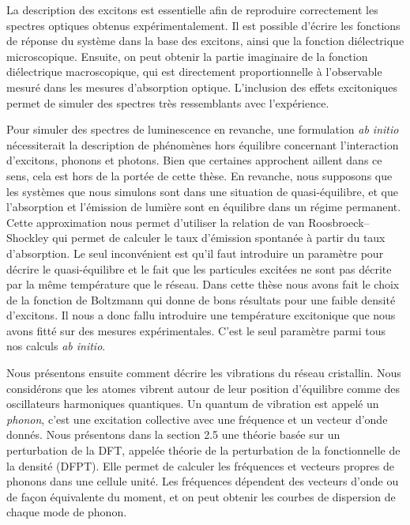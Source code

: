 La description des excitons est essentielle afin de reproduire correctement les spectres optiques obtenus expérimentalement. Il est possible d'écrire les fonctions de réponse du système dans la base des excitons, ainsi que la fonction diélectrique microscopique. Ensuite, on peut obtenir la partie imaginaire de la fonction diélectrique macroscopique, qui est directement proportionnelle à l'observable mesuré dans les mesures d'absorption optique. L'inclusion des effets excitoniques permet de simuler des spectres très ressemblants avec l'expérience.

Pour simuler des spectres de luminescence en revanche, une formulation \textit{ab initio} nécessiterait la description de phénomènes hors équilibre concernant l'interaction d'excitons, phonons et photons. Bien que certaines approchent aillent dans ce sens, cela est hors de la portée de cette thèse. En revanche, nous supposons que les systèmes que nous simulons sont dans une situation de quasi-équilibre, et que l'absorption et l'émission de lumière sont en équilibre dans un régime permanent. Cette approximation nous permet d'utiliser la relation de van Roosbroeck--Shockley qui permet de calculer le taux d'émission spontanée à partir du taux d'absorption. Le seul inconvénient est qu'il faut introduire un paramètre pour décrire le quasi-équilibre et le fait que les particules excitées ne sont pas décrite par la même température que le réseau. Dans cette thèse nous avons fait le choix de la fonction de Boltzmann qui donne de bons résultats pour une faible densité d'excitons. Il nous a donc fallu introduire une température excitonique que nous avons fitté sur des mesures expérimentales. C'est le seul paramètre parmi tous nos calculs \textit{ab initio}.

Nous présentons ensuite comment décrire les vibrations du réseau cristallin. Nous considérons que les atomes vibrent autour de leur position d'équilibre comme des oscillateurs harmoniques quantiques. Un quantum de vibration est appelé un \textit{phonon}, c'est une excitation collective avec une fréquence et un vecteur d'onde donnés. Nous présentons dans la section 2.5 une théorie basée sur un perturbation de la \acrshort{DFT}, appelée théorie de la perturbation de la fonctionnelle de la densité (DFPT). Elle permet de calculer les fréquences et vecteurs propres de phonons dans une cellule unité. Les fréquences dépendent des vecteurs d'onde ou de façon équivalente du moment, et on peut obtenir les courbes de dispersion de chaque mode de phonon. 

